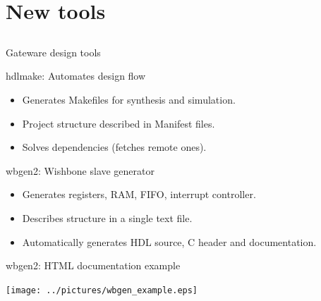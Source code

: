 \documentclass[compress,red]{beamer}
\begin{document}
\section{New tools}

\subsection*{} %

\begin{frame}{Gateware design tools}

  \begin{block}{hdlmake: Automates design flow}
    \begin{itemize}
    \item Generates Makefiles for synthesis and simulation.
    \item Project structure described in Manifest files.
    \item Solves dependencies (fetches remote ones).
    \end{itemize}
  \end{block}

  \begin{block}{wbgen2: Wishbone slave generator}
    \begin{itemize}
    \item Generates registers, RAM, FIFO, interrupt controller.
    \item Describes structure in a single text file.
    \item Automatically generates HDL source, C header and documentation.
    \end{itemize}
  \end{block}


\end{frame}

\begin{frame}{wbgen2: HTML documentation example}

  \begin{center}
    \texttt{[image: ../pictures/wbgen\_example.eps]}
  \end{center}


\end{frame}
\end{document}
